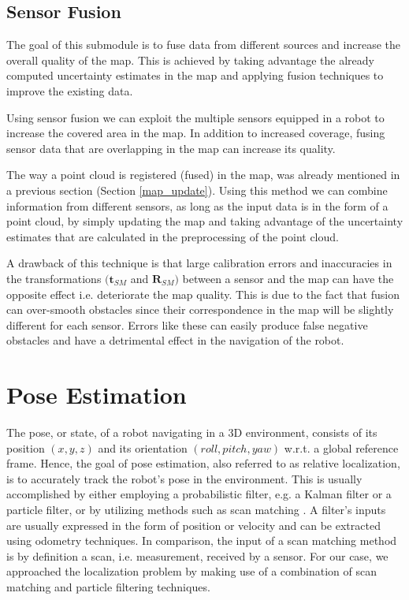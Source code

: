 
\subsection{Sensor Fusion}

The goal of this submodule is to fuse data from different sources and
increase the overall quality of the map.
This is achieved by taking advantage the already computed uncertainty
estimates in the map and applying fusion techniques to improve the
existing data.

Using sensor fusion we can exploit the multiple sensors equipped in
a robot to increase the covered area in the map.
In addition to increased coverage, fusing sensor data that are overlapping
in the map can increase its quality.

The way a point cloud is registered (fused) in the map, was already mentioned
in a previous section (Section \ref{map_update}).
Using this method we can combine information from different sensors, as long
as the input data is in the form of a point cloud, by simply updating the map
and taking advantage of the uncertainty estimates that are calculated
in the preprocessing of the point cloud.


A drawback of this technique is that large calibration errors and inaccuracies
in the transformations $(\mathbf{t}_{SM}$ and $\mathbf{R}_{SM})$ between a
sensor and the map can have the opposite effect i.e. deteriorate the map
quality.
This is due to the fact that fusion can over-smooth obstacles
since their correspondence in the map will be slightly different
for each sensor.
Errors like these can easily produce false negative obstacles and
have a detrimental effect in the navigation of the robot.


\section{Pose Estimation} \label{pose_estimation}

The pose, or state, of a robot navigating in a 3D environment, consists of
its position $(x, y, z)$ and its orientation $(roll, pitch, yaw)$ w.r.t.
a global reference frame.
Hence, the goal of pose estimation, also referred to as relative localization,
is to accurately track the robot's pose in the environment.
This is usually accomplished by either employing a probabilistic filter,
e.g. a Kalman filter or a particle filter, or by utilizing methods such
as scan matching \parencite{Fox2001}.
A filter's inputs are usually expressed in the form of position or velocity
and can be extracted using odometry techniques.
In comparison, the input of a scan matching method is by definition a
scan, i.e. measurement, received by a sensor.
For our case, we approached the localization problem by making use of a
combination of scan matching and particle filtering techniques.

